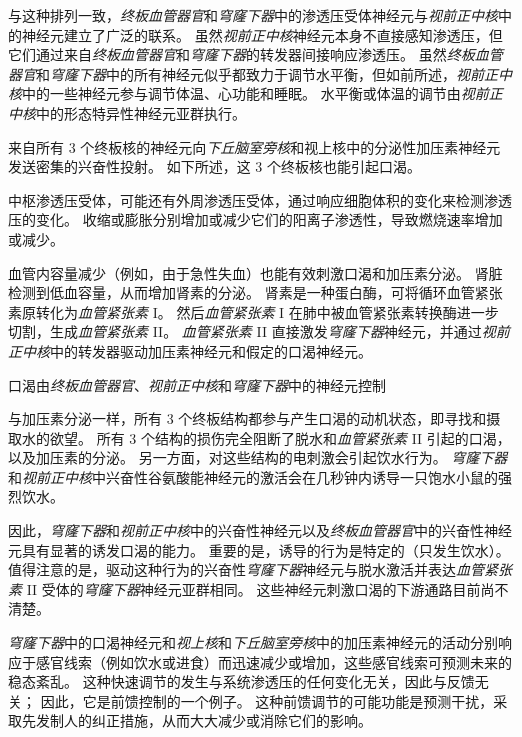 与这种排列一致，\textit{终板血管器官}和\textit{穹窿下器}中的渗透压受体神经元与\textit{视前正中核}中的神经元建立了广泛的联系。
虽然\textit{视前正中核}神经元本身不直接感知渗透压，但它们通过来自\textit{终板血管器官}和\textit{穹窿下器}的转发器间接响应渗透压。
虽然\textit{终板血管器官}和\textit{穹窿下器}中的所有神经元似乎都致力于调节水平衡，但如前所述，\textit{视前正中核}中的一些神经元参与调节体温、心功能和睡眠。
水平衡或体温的调节由\textit{视前正中核}中的形态特异性神经元亚群执行。


来自所有 3 个终板核的神经元向\textit{下丘脑室旁核}和视上核中的分泌性加压素神经元发送密集的兴奋性投射。
如下所述，这 3 个终板核也能引起口渴。


中枢渗透压受体，可能还有外周渗透压受体，通过响应细胞体积的变化来检测渗透压的变化。
收缩或膨胀分别增加或减少它们的阳离子渗透性，导致燃烧速率增加或减少。


血管内容量减少（例如，由于急性失血）也能有效刺激口渴和加压素分泌。
肾脏检测到低血容量，从而增加肾素的分泌。
肾素是一种蛋白酶，可将循环血管紧张素原转化为\textit{血管紧张素} I。
然后\textit{血管紧张素} I 在肺中被血管紧张素转换酶进一步切割，生成\textit{血管紧张素} II。
\textit{血管紧张素} II 直接激发\textit{穹窿下器}神经元，并通过\textit{视前正中核}中的转发器驱动加压素神经元和假定的口渴神经元。


口渴由\textit{终板血管器官}、\textit{视前正中核}和\textit{穹窿下器}中的神经元控制

与加压素分泌一样，所有 3 个终板结构都参与产生口渴的动机状态，即寻找和摄取水的欲望。
所有 3 个结构的损伤完全阻断了脱水和\textit{血管紧张素} II 引起的口渴，以及加压素的分泌。
另一方面，对这些结构的电刺激会引起饮水行为。
\textit{穹窿下器}和\textit{视前正中核}中兴奋性谷氨酸能神经元的激活会在几秒钟内诱导一只饱水小鼠的强烈饮水。


因此，\textit{穹窿下器}和\textit{视前正中核}中的兴奋性神经元以及\textit{终板血管器官}中的兴奋性神经元具有显著的诱发口渴的能力。
重要的是，诱导的行为是特定的（只发生饮水）。
值得注意的是，驱动这种行为的兴奋性\textit{穹窿下器}神经元与脱水激活并表达\textit{血管紧张素} II 受体的\textit{穹窿下器}神经元亚群相同。
这些神经元刺激口渴的下游通路目前尚不清楚。


\textit{穹窿下器}中的口渴神经元和\textit{视上核}和\textit{下丘脑室旁核}中的加压素神经元的活动分别响应于感官线索（例如饮水或进食）而迅速减少或增加，这些感官线索可预测未来的稳态紊乱。
这种快速调节的发生与系统渗透压的任何变化无关，因此与反馈无关；
因此，它是前馈控制的一个例子。
这种前馈调节的可能功能是预测干扰，采取先发制人的纠正措施，从而大大减少或消除它们的影响。


